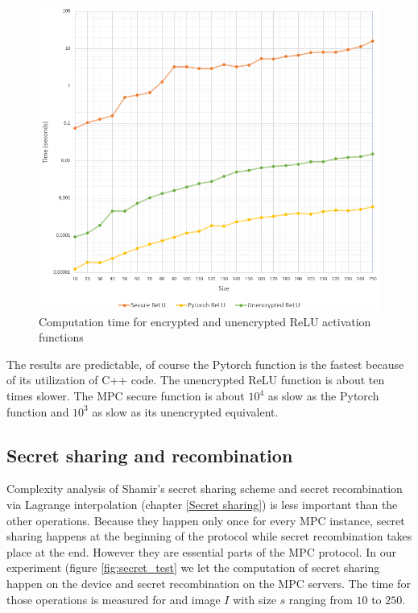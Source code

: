 \begin{figure}[H]
  \includegraphics[scale=0.7]{fig/relu_tests.png}
  \centering
  \caption{Computation time for encrypted and unencrypted ReLU activation functions}
  \label{fig:relu_tests}
\end{figure}

The results are predictable, of course the Pytorch function is the fastest because of its utilization of C++ code. The unencrypted ReLU function is about ten times slower. The MPC secure function is about $10^4$ as slow as the Pytorch function and $10^3$ as slow as its unencrypted equivalent.

\subsection{Secret sharing and recombination}
Complexity analysis of Shamir's secret sharing scheme and secret recombination via Lagrange interpolation (chapter \ref{Secret sharing}) is less important than the other operations. Because they happen only once for every MPC instance, secret sharing happens at the beginning of the protocol while secret recombination takes place at the end. However they are essential parts of the MPC protocol. In our experiment (figure \ref{fig:secret_test} we let the computation of secret sharing happen on the device and secret recombination on the MPC servers. The time for those operations is measured for and image $I$ with size $s$ ranging from $10$ to $250$.

